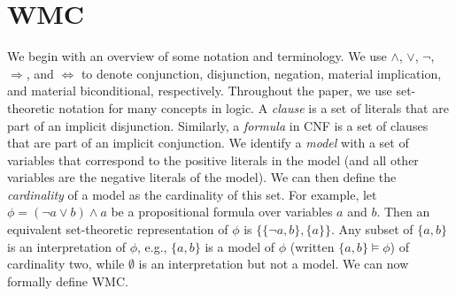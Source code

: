 

\section{WMC} %


We begin with an overview of some notation and terminology. We use $\land$,
$\lor$, $\neg$, $\Rightarrow$, and $\Leftrightarrow$ to denote conjunction,
disjunction, negation, material implication, and material biconditional,
respectively. Throughout the paper, we use set-theoretic notation for many
concepts in logic. A \emph{clause} is a set of literals that are part of an
implicit disjunction. Similarly, a \emph{formula} in CNF is a set of clauses
that are part of an implicit conjunction. We identify a \emph{model} with a set
of variables that correspond to the positive literals in the model (and all
other variables are the negative literals of the model). We can then define the
\emph{cardinality} of a model as the cardinality of this set. For example, let
$\phi = (\neg a \lor b) \land a$ be a propositional formula over variables $a$
and $b$. Then an equivalent set-theoretic representation of $\phi$ is $\{ \{
\neg a, b \}, \{ a \} \}$. Any subset of $\{ a, b \}$ is an interpretation of
$\phi$, e.g., $\{ a, b \}$ is a model of $\phi$ (written $\{ a, b \} \models
\phi$) of cardinality two, while $\emptyset$ is an interpretation but not a
model. We can now formally define WMC.

